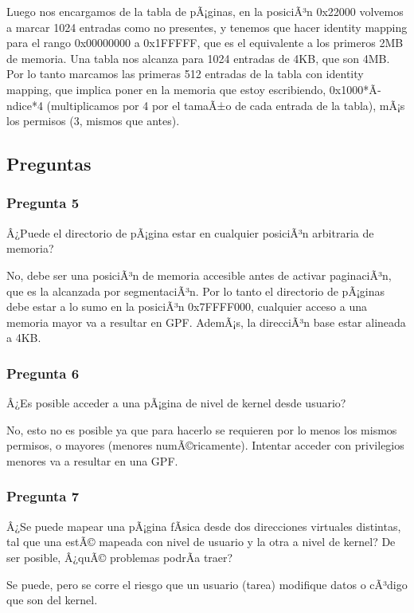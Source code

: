 \documentclass[10pt, a4paper]{article}
\begin{document}
Luego nos encargamos de la tabla de pÃ¡ginas, en la posiciÃ³n 0x22000 volvemos a marcar 1024 entradas como no presentes, y tenemos que hacer identity mapping para el rango 0x00000000 a 0x1FFFFF, que es el equivalente a los primeros 2MB de memoria. Una tabla nos alcanza para 1024 entradas de 4KB, que son 4MB. Por lo tanto marcamos las primeras 512 entradas de la tabla con identity mapping, que implica poner en la memoria que estoy escribiendo, 0x1000*Ã­ndice*4 (multiplicamos por 4 por el tamaÃ±o de cada entrada de la tabla), mÃ¡s los permisos (3, mismos que antes).

\subsection{Preguntas}
\subsubsection*{Pregunta 5}
 \begin{framed}
Â¿Puede el directorio de pÃ¡gina estar en cualquier posiciÃ³n arbitraria de memoria?
\end{framed}
No, debe ser una posiciÃ³n de memoria accesible antes de activar paginaciÃ³n, que es la alcanzada por segmentaciÃ³n. Por lo tanto el directorio de pÃ¡ginas debe estar a lo sumo en la posiciÃ³n 0x7FFFF000, cualquier acceso a una memoria mayor va a resultar en GPF. AdemÃ¡s, la direcciÃ³n base estar alineada a 4KB.
\subsubsection*{Pregunta 6}
 \begin{framed}
Â¿Es posible acceder a una pÃ¡gina de nivel de kernel desde usuario?
\end{framed}
No, esto no es posible ya que para hacerlo se requieren por lo menos los mismos permisos, o mayores (menores numÃ©ricamente). Intentar acceder con privilegios menores va a resultar en una GPF.
\subsubsection*{Pregunta 7}
 \begin{framed}
Â¿Se puede mapear una pÃ¡gina fÃ­sica desde dos direcciones virtuales distintas, tal que una estÃ© mapeada con nivel de usuario y la otra a nivel de kernel?
De ser posible, Â¿quÃ© problemas podrÃ­a traer?
\end{framed}
Se puede, pero se corre el riesgo que un usuario (tarea) modifique datos o cÃ³digo que son del kernel.
\end{document}
